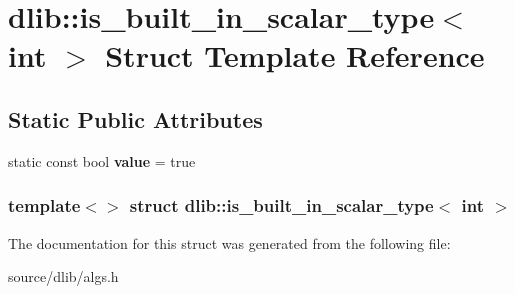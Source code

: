 \hypertarget{structdlib_1_1is__built__in__scalar__type_3_01int_01_4}{
\section{dlib::is\_\-built\_\-in\_\-scalar\_\-type$<$ int $>$ Struct Template Reference}
\label{structdlib_1_1is__built__in__scalar__type_3_01int_01_4}
}
\subsection*{Static Public Attributes}
\begin{DoxyCompactItemize}
\item 
\hypertarget{structdlib_1_1is__built__in__scalar__type_3_01int_01_4_a1af5d205e0ebc75014277a29000f78fc}{
static const bool {\bfseries value} = true}
\label{structdlib_1_1is__built__in__scalar__type_3_01int_01_4_a1af5d205e0ebc75014277a29000f78fc}

\end{DoxyCompactItemize}
\subsubsection*{template$<$$>$ struct dlib::is\_\-built\_\-in\_\-scalar\_\-type$<$ int $>$}



The documentation for this struct was generated from the following file:\begin{DoxyCompactItemize}
\item 
source/dlib/algs.h\end{DoxyCompactItemize}

